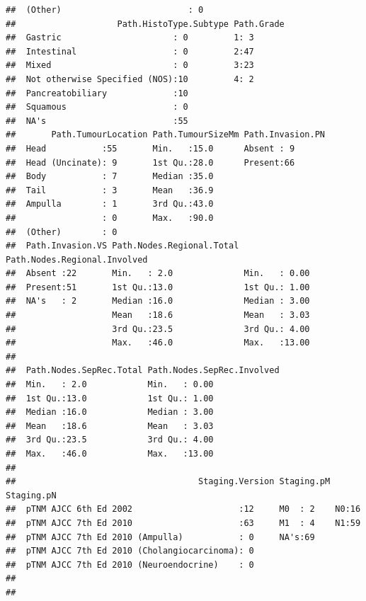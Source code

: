 \documentclass{article}\usepackage[]{graphicx}\usepackage[]{color}
\makeatletter
\newenvironment{kframe}{%
 \def\at@end@of@kframe{}%
 \ifinner\ifhmode%
  \def\at@end@of@kframe{\end{minipage}}%
  \begin{minipage}{\columnwidth}%
 \fi\fi%
 \def\FrameCommand##1{\hskip\@totalleftmargin \hskip-\fboxsep
 \colorbox{shadecolor}{##1}\hskip-\fboxsep
     \hskip-\linewidth \hskip-\@totalleftmargin \hskip\columnwidth}%
 \MakeFramed {\advance\hsize-\width
   \@totalleftmargin\z@ \linewidth\hsize
   \@setminipage}}%
 {\par\unskip\endMakeFramed%
 \at@end@of@kframe}
\newenvironment{knitrout}{}{} %
\makeatother
\begin{document}
\begin{knitrout}
\begin{kframe}
\begin{verbatim}
##  (Other)                         : 0    
##                    Path.HistoType.Subtype Path.Grade
##  Gastric                      : 0         1: 3      
##  Intestinal                   : 0         2:47      
##  Mixed                        : 0         3:23      
##  Not otherwise Specified (NOS):10         4: 2      
##  Pancreatobiliary             :10                   
##  Squamous                     : 0                   
##  NA's                         :55                   
##       Path.TumourLocation Path.TumourSizeMm Path.Invasion.PN
##  Head           :55       Min.   :15.0      Absent : 9      
##  Head (Uncinate): 9       1st Qu.:28.0      Present:66      
##  Body           : 7       Median :35.0                      
##  Tail           : 3       Mean   :36.9                      
##  Ampulla        : 1       3rd Qu.:43.0                      
##                 : 0       Max.   :90.0                      
##  (Other)        : 0                                         
##  Path.Invasion.VS Path.Nodes.Regional.Total Path.Nodes.Regional.Involved
##  Absent :22       Min.   : 2.0              Min.   : 0.00               
##  Present:51       1st Qu.:13.0              1st Qu.: 1.00               
##  NA's   : 2       Median :16.0              Median : 3.00               
##                   Mean   :18.6              Mean   : 3.03               
##                   3rd Qu.:23.5              3rd Qu.: 4.00               
##                   Max.   :46.0              Max.   :13.00               
##                                                                         
##  Path.Nodes.SepRec.Total Path.Nodes.SepRec.Involved
##  Min.   : 2.0            Min.   : 0.00             
##  1st Qu.:13.0            1st Qu.: 1.00             
##  Median :16.0            Median : 3.00             
##  Mean   :18.6            Mean   : 3.03             
##  3rd Qu.:23.5            3rd Qu.: 4.00             
##  Max.   :46.0            Max.   :13.00             
##                                                    
##                                    Staging.Version Staging.pM Staging.pN
##  pTNM AJCC 6th Ed 2002                     :12     M0  : 2    N0:16     
##  pTNM AJCC 7th Ed 2010                     :63     M1  : 4    N1:59     
##  pTNM AJCC 7th Ed 2010 (Ampulla)           : 0     NA's:69              
##  pTNM AJCC 7th Ed 2010 (Cholangiocarcinoma): 0                          
##  pTNM AJCC 7th Ed 2010 (Neuroendocrine)    : 0                          
##                                                                         
##                                                                         

\end{verbatim}
\end{kframe}
\end{knitrout}
\end{document}
